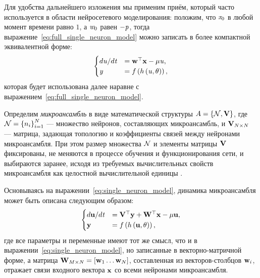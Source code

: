 
Для удобства дальнейшего изложения мы применим приём, который часто используется в области нейросетевого моделирования: положим, что $\vectoritem{x}{0}$ в любой момент времени равно $1$, а $\vectoritem{w}{0}$ равен $-\mathit{p}$, тогда выражение~\eqref{eq:full_single_neuron_model} можно записать в более компактной эквивалентной форме:
\begin{equation}
    \label{eq:single_neuron_model}
    \begin{cases}
        d\mathit{u} / d\mathit{t}   &=  \mathrm{\mathbf{w}}^{\top} \mathrm{\mathbf{x}} - \mu \mathit{u}, \\
        \mathit{y}                  &=  f\left( h\left( \mathit{u}, \theta \right) \right), \\
    \end{cases}
\end{equation}
которая будет использована далее наравне с выражением~\eqref{eq:full_single_neuron_model}.

\begin{Definition*}
    Определим \textit{микроансамбль} в виде математической структуры $A = \left\{ \mathcal{N}, \mathrm{\mathbf{V}} \right\}$, где $\mathcal{N} = \left\{ n_{i} \right\}_{i=1}^{N} $ --- множество нейронов, составляющих микроансамбль, и $\mathrm{\mathbf{V}}_{N \times N}$ --- матрица, задающая топологию и коэффициенты связей между нейронами микроансамбля. При этом размер множества $\mathcal{N}$ и элементы матрицы $\mathrm{\mathbf{V}}$ фиксированы, \ie не меняются в процессе обучения и функционирования сети, и выбираются заранее, исходя из требуемых вычислительных свойств микроансамбля как целостной вычислительной единицы .
\end{Definition*}

Основываясь на выражении~\eqref{eq:single_neuron_model}, динамика микроансамбля может быть описана следующим образом:
\begin{equation}
    \label{eq:microensemble_model}
    \begin{cases}
        d\mathrm{\mathbf{u}}/d\mathit{t} &= \mathrm{\mathbf{V}}^{\top} \mathrm{\mathbf{y}} + \mathrm{\mathbf{W}}^{\top} \mathrm{\mathbf{x}} - \mu \mathrm{\mathbf{u}}, \\
        \mathrm{\mathbf{y}}              &= f\left( h\left( \mathrm{\mathbf{u}}, \theta \right) \right), \\
    \end{cases}
\end{equation}
где все параметры и переменные имеют тот же смысл, что и в выражении~\eqref{eq:single_neuron_model}, но записанные в векторно-матричной форме, а матрица $\mathrm{\mathbf{W}}_{M \times N} = \left[ \mathrm{\mathbf{w}}_{1} \ldots \mathrm{\mathbf{w}}_{N} \right]$, составленная из векторов-столбцов $\mathrm{\mathbf{w}}_{i}$, отражает связи входного вектора $\mathrm{\mathbf{x}}$ со всеми нейронами микроансамбля.

